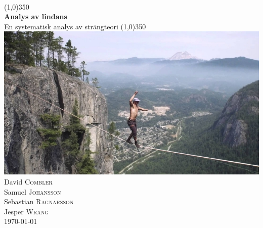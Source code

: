 
\begin{titlepage}
    \\[0.7cm]
    \begin{center}
        \line(1,0){350}\\
        [0.4cm]
        \huge{\bfseries Analys av lindans}\\
        {\large{En systematisk analys av strängteori}}
        \line(1,0){350}\\[0.5cm]
        
        \includegraphics[scale=0.5]{bilder/lindans}\\[2cm]
               
        \Large{David \textsc{Combler}\\
        Samuel \textsc{Johansson}\\
        Sebastian \textsc{Ragnarsson}\\
        Jesper \textsc{Wrang}}\\[2cm]
        

        {\Large \today}\\[3cm] %
    
    \end{center}
\end{titlepage}